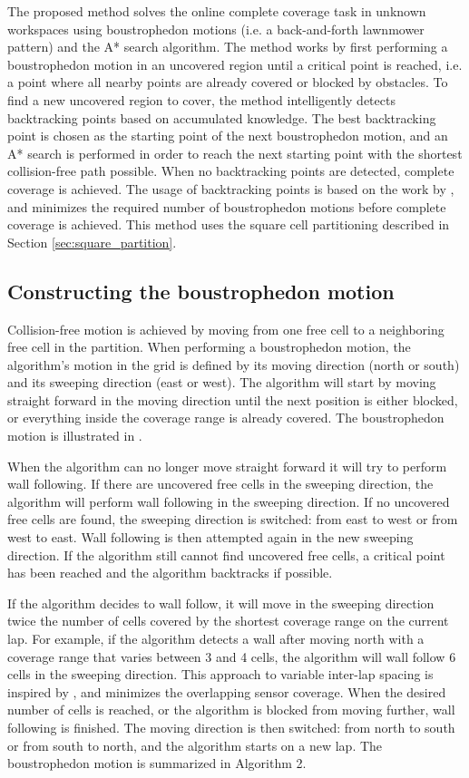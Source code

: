 The proposed method solves the online complete coverage task in unknown workspaces using boustrophedon motions (i.e. a back-and-forth lawnmower pattern) and the A* search algorithm. The method works by first performing a boustrophedon motion in an uncovered region until a critical point is reached, i.e. a point where all nearby points are already covered or blocked by obstacles. To find a new uncovered region to cover, the method intelligently detects backtracking points based on accumulated knowledge. The best backtracking point is chosen as the starting point of the next boustrophedon motion, and an A* search is performed in order to reach the next starting point with the shortest collision-free path possible. When no backtracking points are detected, complete coverage is achieved. The usage of backtracking points is based on the work by \citet{Viet2013}, and minimizes the required number of boustrophedon motions before complete coverage is achieved. This method uses the square cell partitioning described in Section \ref{sec:square_partition}.

\subsection{Constructing the boustrophedon motion}

Collision-free motion is achieved by moving from one free cell to a neighboring free cell in the partition. When performing a boustrophedon motion, the algorithm's motion in the grid is defined by its moving direction (north or south) and its sweeping direction (east or west). The algorithm will start by moving straight forward in the moving direction until the next position is either blocked, or everything inside the coverage range is already covered. The boustrophedon motion is illustrated in .

When the algorithm can no longer move straight forward it will try to perform wall following. If there are uncovered free cells in the sweeping direction, the algorithm will perform wall following in the sweeping direction. If no uncovered free cells are found, the sweeping direction is switched: from east to west or from west to east. Wall following is then attempted again in the new sweeping direction. If the algorithm still cannot find uncovered free cells, a critical point has been reached and the algorithm backtracks if possible.

If the algorithm decides to wall follow, it will move in the sweeping direction twice the number of cells covered by the shortest coverage range on the current lap.
For example, if the algorithm detects a wall after moving north with a coverage range that varies between 3 and 4 cells, the algorithm will wall follow 6 cells in the sweeping direction. This approach to variable inter-lap spacing is inspired by \citet{galceran2012efficient}, and minimizes the overlapping sensor coverage. When the desired number of cells is reached, or the algorithm is blocked from moving further, wall following is finished. The moving direction is then switched: from north to south or from south to north, and the algorithm starts on a new lap. The boustrophedon motion is summarized in Algorithm 2.

